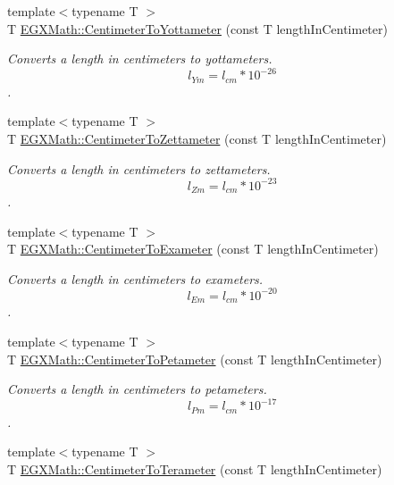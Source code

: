 \begin{DoxyCompactItemize}
{\footnotesize template$<$typename T $>$ }\\T \mbox{\hyperlink{group___e_g_x_math-_conversions-_length_conversions-_s_i-_centimeter-_s_i_gace13ddc9d41561595a03d858577763c3}{E\+G\+X\+Math\+::\+Centimeter\+To\+Yottameter}} (const T length\+In\+Centimeter)
\begin{DoxyCompactList}\small\item\em Converts a length in centimeters to yottameters. \[ l_{Ym}=l_{cm} * 10^{-26} \]. \end{DoxyCompactList}\item 
{\footnotesize template$<$typename T $>$ }\\T \mbox{\hyperlink{group___e_g_x_math-_conversions-_length_conversions-_s_i-_centimeter-_s_i_ga20ad80d764e7cc6f34245fe2ab4e7772}{E\+G\+X\+Math\+::\+Centimeter\+To\+Zettameter}} (const T length\+In\+Centimeter)
\begin{DoxyCompactList}\small\item\em Converts a length in centimeters to zettameters. \[ l_{Zm}=l_{cm} * 10^{-23} \]. \end{DoxyCompactList}\item 
{\footnotesize template$<$typename T $>$ }\\T \mbox{\hyperlink{group___e_g_x_math-_conversions-_length_conversions-_s_i-_centimeter-_s_i_ga8b69e702b6a245a68f57d52474f21c1a}{E\+G\+X\+Math\+::\+Centimeter\+To\+Exameter}} (const T length\+In\+Centimeter)
\begin{DoxyCompactList}\small\item\em Converts a length in centimeters to exameters. \[ l_{Em}=l_{cm} * 10^{-20} \]. \end{DoxyCompactList}\item 
{\footnotesize template$<$typename T $>$ }\\T \mbox{\hyperlink{group___e_g_x_math-_conversions-_length_conversions-_s_i-_centimeter-_s_i_ga8fa14e761d09dc55608c28c2101f2d26}{E\+G\+X\+Math\+::\+Centimeter\+To\+Petameter}} (const T length\+In\+Centimeter)
\begin{DoxyCompactList}\small\item\em Converts a length in centimeters to petameters. \[ l_{Pm}=l_{cm} * 10^{-17} \]. \end{DoxyCompactList}\item 
{\footnotesize template$<$typename T $>$ }\\T \mbox{\hyperlink{group___e_g_x_math-_conversions-_length_conversions-_s_i-_centimeter-_s_i_ga84d4f8159550a726d78bb55e6247e10c}{E\+G\+X\+Math\+::\+Centimeter\+To\+Terameter}} (const T length\+In\+Centimeter)

\end{DoxyCompactItemize}
